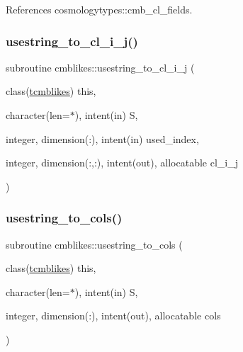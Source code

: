 References cosmologytypes\+::cmb\+\_\+cl\+\_\+fields.

\mbox{\label{namespacecmblikes_aacd5ae93afb3acb0e509842bbfeb7e4e}} 
\subsubsection{\texorpdfstring{usestring\+\_\+to\+\_\+cl\+\_\+i\+\_\+j()}{usestring\_to\_cl\_i\_j()}}
{\footnotesize\ttfamily subroutine cmblikes\+::usestring\+\_\+to\+\_\+cl\+\_\+i\+\_\+j (\begin{DoxyParamCaption}\item[{class(\mbox{\hyperlink{structcmblikes_1_1tcmblikes}{tcmblikes}})}]{this,  }\item[{character(len=$\ast$), intent(in)}]{S,  }\item[{integer, dimension(\+:), intent(in)}]{used\+\_\+index,  }\item[{integer, dimension(\+:,\+:), intent(out), allocatable}]{cl\+\_\+i\+\_\+j }\end{DoxyParamCaption})\hspace{0.3cm}{\ttfamily [private]}}

\mbox{\label{namespacecmblikes_a6ccd97b88f377eae282aaa60c1661b49}} 
\subsubsection{\texorpdfstring{usestring\+\_\+to\+\_\+cols()}{usestring\_to\_cols()}}
{\footnotesize\ttfamily subroutine cmblikes\+::usestring\+\_\+to\+\_\+cols (\begin{DoxyParamCaption}\item[{class(\mbox{\hyperlink{structcmblikes_1_1tcmblikes}{tcmblikes}})}]{this,  }\item[{character(len=$\ast$), intent(in)}]{S,  }\item[{integer, dimension(\+:), intent(out), allocatable}]{cols }\end{DoxyParamCaption})\hspace{0.3cm}{\ttfamily [private]}}



